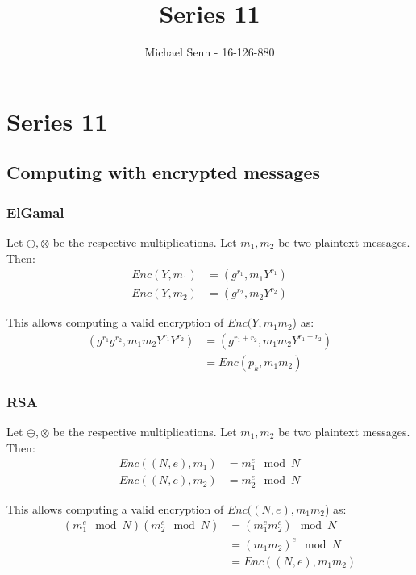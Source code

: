 \documentclass[a4paper]{scrreprt}
\title{Series 11}
\author{Michael Senn \maillink{michael.senn@students.unibe.ch} - 16-126-880}
\date{\printdate}
\begin{document}
\maketitle


\setcounter{chapter}{10}

\chapter{Series 11}

\section{Computing with encrypted messages}

\subsection{ElGamal}

Let $\oplus, \otimes$ be the respective multiplications. Let $m_1, m_2$ be two
plaintext messages. Then:
\begin{align*}
	Enc(Y, m_1) & = (g^{r_1}, m_1 Y^{r_1}) \\
	Enc(Y, m_2) & = (g^{r_2}, m_2 Y^{r_2})
\end{align*}

This allows computing a valid encryption of $Enc(Y, m_1 m_2$) as:
\begin{align*}
	(g^{r_1} g^{r_2}, m_1 m_2 Y^{r_1} Y^{r_2}) & = (g^{r_1 + r_2}, m_1 m_2 Y^{r_1 + r_2}) \\
						   & = Enc(p_k, m_1 m_2)
\end{align*}

\subsection{RSA}

Let $\oplus, \otimes$ be the respective multiplications. Let $m_1, m_2$ be two
plaintext messages. Then:
\begin{align*}
	Enc((N, e), m_1) & = m_1^e \mod N \\
	Enc((N, e), m_2) & = m_2^e \mod N
\end{align*}

This allows computing a valid encryption of $Enc((N, e), m_1 m_2$) as:
\begin{align*}
	(m_1^e \mod N) (m_2^e \mod N) & = (m_1^e m_2^e) \mod N \\
				      & = (m_1 m_2)^e \mod N \\
				      & = Enc((N, e), m_1 m_2)
\end{align*}
\end{document}
